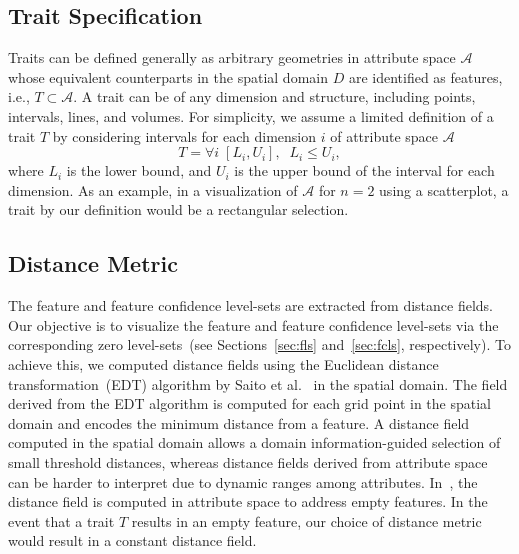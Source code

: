 \subsection{Trait Specification}
Traits can be defined generally as arbitrary geometries in attribute space $\mathcal{A}$ whose equivalent counterparts in the spatial domain $D$ are identified as features, i.e., $T\subset\mathcal{A}$.
%
A trait can be of any dimension and structure, including points, intervals, lines, and volumes.
%
%
For simplicity, we assume a limited definition of a trait $T$ by considering intervals for each dimension $i$ of attribute space $\mathcal{A}$
%
\begin{equation}	
T = \forall{i}\;[L_{i}, U_{i}], \;\;L_{i} \leqslant U_{i}, 
\end{equation}
where $L_{i}$ is the lower bound, and $U_{i}$ is the upper bound of the interval for each dimension.
%
As an example, in a visualization of $\mathcal{A}$ for $n = 2$ using a scatterplot, a trait by our definition would be a rectangular selection.

\vspace{-2mm}
\subsection{Distance Metric}
%

The feature and feature confidence level-sets are extracted from distance fields.
%
Our objective is to visualize the feature and feature confidence level-sets via the corresponding zero level-sets~(see Sections~\ref{sec:fls} and~\ref{sec:fcls}, respectively). 
%
To achieve this, we computed distance fields using the Euclidean distance transformation~(EDT) algorithm by Saito et al.~\cite{saito1994new} in the spatial domain.
%
The field derived from the EDT algorithm is computed for each grid point in the spatial domain and encodes the minimum distance from a feature.
%
A distance field computed in the spatial domain allows a domain information-guided selection of small threshold distances, whereas distance fields derived from attribute space can be harder to interpret due to dynamic ranges among attributes.
%
In~\cite{jankowai2020feature}, the distance field is computed in attribute space to address empty features.
%
In the event that a trait $T$ results in an empty feature, our choice of distance metric would result in a constant distance field.
%


